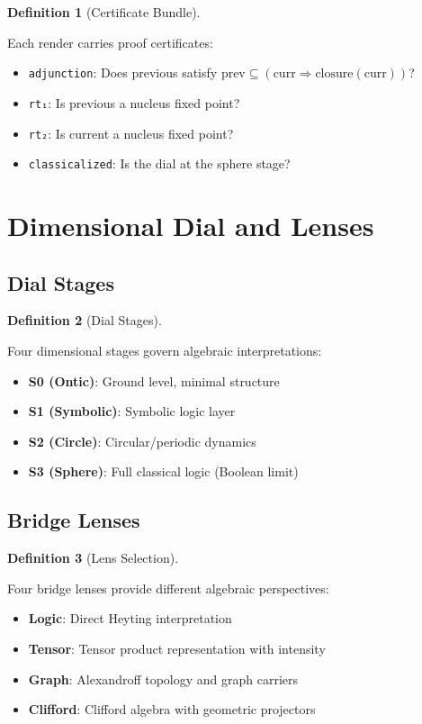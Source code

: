 \documentclass{amsart}
\theoremstyle{definition}
\newtheorem{definition}{Definition}[section]
\theoremstyle{remark}
\begin{document}
\begin{definition}[Certificate Bundle]
\label{def:certificates}
\uses{}

Each render carries proof certificates:
\begin{itemize}
\item \texttt{adjunction}: Does previous satisfy $\text{prev} \subseteq (\text{curr} \Rightarrow \text{closure}(\text{curr}))$?
\item \texttt{rt₁}: Is previous a nucleus fixed point?
\item \texttt{rt₂}: Is current a nucleus fixed point?
\item \texttt{classicalized}: Is the dial at the sphere stage?
\end{itemize}
\end{definition}

\section{Dimensional Dial and Lenses}

\subsection{Dial Stages}
\label{sec:dial-stages}

\begin{definition}[Dial Stages]
\label{def:dial-stages}
\uses{}

Four dimensional stages govern algebraic interpretations:
\begin{itemize}
\item \textbf{S0 (Ontic)}: Ground level, minimal structure
\item \textbf{S1 (Symbolic)}: Symbolic logic layer
\item \textbf{S2 (Circle)}: Circular/periodic dynamics
\item \textbf{S3 (Sphere)}: Full classical logic (Boolean limit)
\end{itemize}
\end{definition}

\subsection{Bridge Lenses}
\label{sec:lenses}

\begin{definition}[Lens Selection]
\label{def:lens}
\uses{}

Four bridge lenses provide different algebraic perspectives:
\begin{itemize}
\item \textbf{Logic}: Direct Heyting interpretation
\item \textbf{Tensor}: Tensor product representation with intensity
\item \textbf{Graph}: Alexandroff topology and graph carriers
\item \textbf{Clifford}: Clifford algebra with geometric projectors
\end{itemize}
\end{definition}
\end{document}
